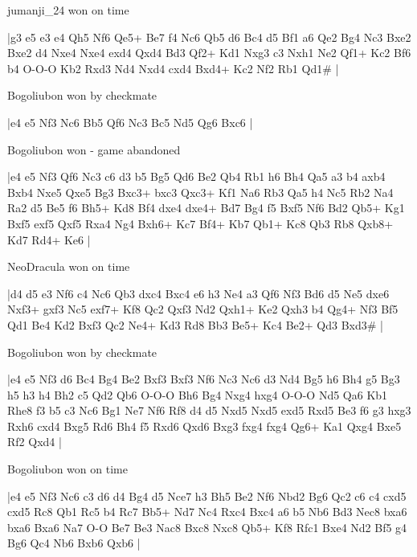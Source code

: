 jumanji\_24 won on time

\makegametitle
|g3 e5 e3 e4 Qh5 Nf6 Qe5+ Be7 f4 Nc6 Qb5 d6 Bc4 d5 Bf1 a6 Qe2 Bg4 Nc3 Bxe2 Bxe2 d4 Nxe4 Nxe4 exd4 Qxd4 Bd3 Qf2+ Kd1 Nxg3 c3 Nxh1 Ne2 Qf1+ Kc2 Bf6 b4 O-O-O Kb2 Rxd3 Nd4 Nxd4 cxd4 Bxd4+ Kc2 Nf2 Rb1 Qd1\#  |

\showboard

Bogoliubon won by checkmate

\makegametitle
|e4 e5 Nf3 Nc6 Bb5 Qf6 Nc3 Bc5 Nd5 Qg6 Bxc6  |

\showboard

Bogoliubon won - game abandoned

\makegametitle
|e4 e5 Nf3 Qf6 Nc3 c6 d3 b5 Bg5 Qd6 Be2 Qb4 Rb1 h6 Bh4 Qa5 a3 b4 axb4 Bxb4 Nxe5 Qxe5 Bg3 Bxc3+ bxc3 Qxc3+ Kf1 Na6 Rb3 Qa5 h4 Nc5 Rb2 Na4 Ra2 d5 Be5 f6 Bh5+ Kd8 Bf4 dxe4 dxe4+ Bd7 Bg4 f5 Bxf5 Nf6 Bd2 Qb5+ Kg1 Bxf5 exf5 Qxf5 Rxa4 Ng4 Bxh6+ Kc7 Bf4+ Kb7 Qb1+ Kc8 Qb3 Rb8 Qxb8+ Kd7 Rd4+ Ke6  |

\showboard

NeoDracula won on time

\makegametitle
|d4 d5 e3 Nf6 c4 Nc6 Qb3 dxc4 Bxc4 e6 h3 Ne4 a3 Qf6 Nf3 Bd6 d5 Ne5 dxe6 Nxf3+ gxf3 Nc5 exf7+ Kf8 Qc2 Qxf3 Nd2 Qxh1+ Ke2 Qxh3 b4 Qg4+ Nf3 Bf5 Qd1 Be4 Kd2 Bxf3 Qc2 Ne4+ Kd3 Rd8 Bb3 Be5+ Kc4 Be2+ Qd3 Bxd3\#  |

\showboard

Bogoliubon won by checkmate

\makegametitle
|e4 e5 Nf3 d6 Bc4 Bg4 Be2 Bxf3 Bxf3 Nf6 Nc3 Nc6 d3 Nd4 Bg5 h6 Bh4 g5 Bg3 h5 h3 h4 Bh2 c5 Qd2 Qb6 O-O-O Bh6 Bg4 Nxg4 hxg4 O-O-O Nd5 Qa6 Kb1 Rhe8 f3 b5 c3 Nc6 Bg1 Ne7 Nf6 Rf8 d4 d5 Nxd5 Nxd5 exd5 Rxd5 Be3 f6 g3 hxg3 Rxh6 cxd4 Bxg5 Rd6 Bh4 f5 Rxd6 Qxd6 Bxg3 fxg4 fxg4 Qg6+ Ka1 Qxg4 Bxe5 Rf2 Qxd4  |

\showboard

Bogoliubon won on time

\makegametitle
|e4 e5 Nf3 Nc6 c3 d6 d4 Bg4 d5 Nce7 h3 Bh5 Be2 Nf6 Nbd2 Bg6 Qc2 c6 c4 cxd5 cxd5 Rc8 Qb1 Rc5 b4 Rc7 Bb5+ Nd7 Nc4 Rxc4 Bxc4 a6 b5 Nb6 Bd3 Nec8 bxa6 bxa6 Bxa6 Na7 O-O Be7 Be3 Nac8 Bxc8 Nxc8 Qb5+ Kf8 Rfc1 Bxe4 Nd2 Bf5 g4 Bg6 Qc4 Nb6 Bxb6 Qxb6  |

